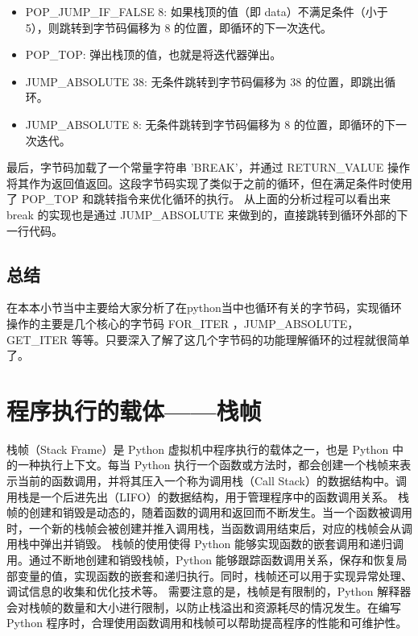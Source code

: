 \begin{itemize}
\item POP\_JUMP\_IF\_FALSE 8: 如果栈顶的值（即 data）不满足条件（小于 5），则跳转到字节码偏移为 8 的位置，即循环的下一次迭代。 
\item POP\_TOP: 弹出栈顶的值，也就是将迭代器弹出。 
\item JUMP\_ABSOLUTE 38: 无条件跳转到字节码偏移为 38 的位置，即跳出循环。 
\item JUMP\_ABSOLUTE 8: 无条件跳转到字节码偏移为 8 的位置，即循环的下一次迭代。 
\end{itemize}
最后，字节码加载了一个常量字符串 'BREAK'，并通过 RETURN\_VALUE 操作将其作为返回值返回。这段字节码实现了类似于之前的循环，但在满足条件时使用了 POP\_TOP 和跳转指令来优化循环的执行。
从上面的分析过程可以看出来 break 的实现也是通过 JUMP\_ABSOLUTE 来做到的，直接跳转到循环外部的下一行代码。
\subsection{总结}
在本本小节当中主要给大家分析了在python当中也循环有关的字节码，实现循环操作的主要是几个核心的字节码 FOR\_ITER ，JUMP\_ABSOLUTE，GET\_ITER 等等。只要深入了解了这几个字节码的功能理解循环的过程就很简单了。


\section{程序执行的载体——栈帧}
栈帧（Stack Frame）是 Python 虚拟机中程序执行的载体之一，也是 Python 中的一种执行上下文。每当 Python 执行一个函数或方法时，都会创建一个栈帧来表示当前的函数调用，并将其压入一个称为调用栈（Call Stack）的数据结构中。调用栈是一个后进先出（LIFO）的数据结构，用于管理程序中的函数调用关系。
栈帧的创建和销毁是动态的，随着函数的调用和返回而不断发生。当一个函数被调用时，一个新的栈帧会被创建并推入调用栈，当函数调用结束后，对应的栈帧会从调用栈中弹出并销毁。
栈帧的使用使得 Python 能够实现函数的嵌套调用和递归调用。通过不断地创建和销毁栈帧，Python 能够跟踪函数调用关系，保存和恢复局部变量的值，实现函数的嵌套和递归执行。同时，栈帧还可以用于实现异常处理、调试信息的收集和优化技术等。
需要注意的是，栈帧是有限制的，Python 解释器会对栈帧的数量和大小进行限制，以防止栈溢出和资源耗尽的情况发生。在编写 Python 程序时，合理使用函数调用和栈帧可以帮助提高程序的性能和可维护性。
